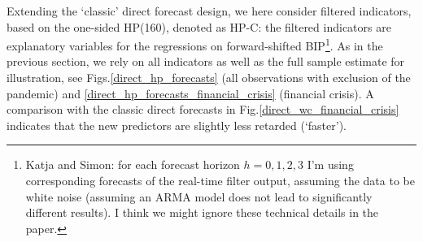 \documentclass[a4paper]{article}
\begin{document}
Extending the `classic' direct forecast design, we here consider filtered indicators, based on the one-sided HP(160), denoted as HP-C: the filtered indicators are explanatory variables for the regressions on forward-shifted BIP\footnote{Katja and Simon: for each forecast horizon $h=0,1,2,3$ I'm using corresponding forecasts of the real-time filter output, assuming the data to be white noise (assuming an ARMA model does not lead to significantly different results). I think we might ignore these technical details in the paper.}. As in the previous section, we rely on all indicators as well as the full sample estimate for illustration, see Figs.\eqref{direct_hp_forecasts} (all observations with exclusion of the pandemic) and \eqref{direct_hp_forecasts_financial_crisis} (financial crisis). A comparison with the classic direct forecasts in Fig.\eqref{direct_wc_financial_crisis} indicates that the new predictors are slightly less retarded (`faster'). 
\end{document}
